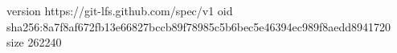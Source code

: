version https://git-lfs.github.com/spec/v1
oid sha256:8a7f8af672fb13e66827bccb89f78985c5b6bec5e46394ec989f8aedd8941720
size 262240
